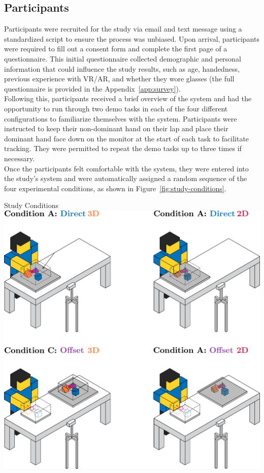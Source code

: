 \subsection{Participants}

Participants were recruited for the study via email and text message using a standardized script to ensure the process was unbiased. Upon arrival, participants were required to fill out a consent form and complete the first page of a questionnaire. This initial questionnaire collected demographic and personal information that could influence the study results, such as age, handedness, previous experience with VR/AR, and whether they wore glasses (the full questionnaire is provided in the Appendix~\ref{app:survey}). \\

Following this, participants received a brief overview of the system and had the opportunity to run through two demo tasks in each of the four different configurations to familiarize themselves with the system. Participants were instructed to keep their non-dominant hand on their lap and place their dominant hand face down on the monitor at the start of each task to facilitate tracking. They were permitted to repeat the demo tasks up to three times if necessary. \\

Once the participants felt comfortable with the system, they were entered into the study's system and were automatically assigned a random sequence of the four experimental conditions, as shown in Figure~\ref{fig:study-conditions}.

\begin{figureBox}[label={fig:study-conditions}, width=0.8\linewidth]{Study Conditions}
\includegraphics[width = 0.8\linewidth]{./implementation/figures/study-conditions.pdf}
\end{figureBox}

